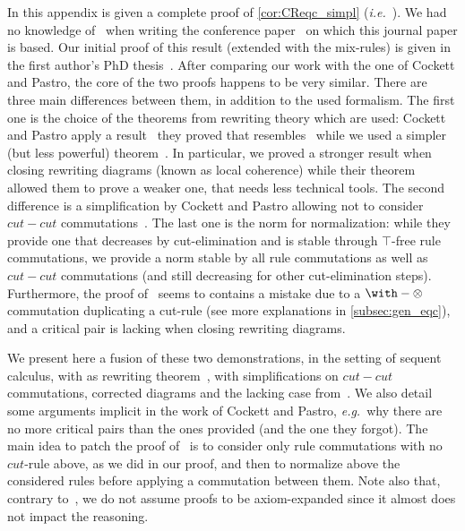 \documentclass{lmcs}
\newcommand*{\tens}{\otimes} %
\newcommand*{\ie}{\emph{i.e.}}
\newcommand*{\eg}{\emph{e.g.}}
\begin{document}
In this appendix is given a complete proof of \autoref{cor:CReqc_simpl} (\ie\ \cite[Theorem~5.1]{calculusformall}).
We had no knowledge of~\cite{calculusformall} when writing the conference paper~\cite{DiGuardiaLaurent23} on which this journal paper is based.
Our initial proof of this result (extended with the mix-rules) is given in the first author's PhD thesis~\cite[Theorem~2.47]{phddiguardia}.
After comparing our work with the one of Cockett and Pastro, the core of the two proofs happens to be very similar.
There are three main differences between them, in addition to the used formalism.
The first one is the choice of the theorems from rewriting theory which are used: Cockett and Pastro apply a result~\cite[Proposition~B.3]{calculusformall} they proved that resembles~\cite[Theorem~2.2]{aototoyama2012} while we used a simpler (but less powerful) theorem~\cite{huet80}.
In particular, we proved a stronger result when closing rewriting diagrams (known as local coherence) while their theorem allowed them to prove a weaker one, that needs less technical tools.
The second difference is a simplification by Cockett and Pastro allowing not to consider $cut-cut$ commutations~\cite[Lemma~C.2]{calculusformall}.
The last one is the norm for normalization: while they provide one that decreases by cut-elimination and is stable through $\top$-free rule commutations, we provide a norm stable by all rule commutations as well as $cut-cut$ commutations (and still decreasing for other cut-elimination steps).
Furthermore, the proof of~\cite[Theorem~5.1]{calculusformall} seems to contains a mistake due to a $\with-\tens$ commutation duplicating a cut-rule (see more explanations in \autoref{subsec:gen_eqc}), and a critical pair is lacking when closing rewriting diagrams.

We present here a fusion of these two demonstrations, in the setting of sequent calculus, with as rewriting theorem~\cite[Theorem~2.2]{aototoyama2012}, with simplifications on $cut-cut$ commutations, corrected diagrams and the lacking case from~\cite{calculusformall}.
We also detail some arguments implicit in the work of Cockett and Pastro, \eg\ why there are no more critical pairs than the ones provided (and the one they forgot).
The main idea to patch the proof of~\cite{calculusformall} is to consider only rule commutations with no $cut$-rule above, as we did in our proof, and then to normalize above the considered rules before applying a commutation between them.
Note also that, contrary to~\cite{calculusformall}, we do not assume proofs to be axiom-expanded since it almost does not impact the reasoning.
\end{document}
